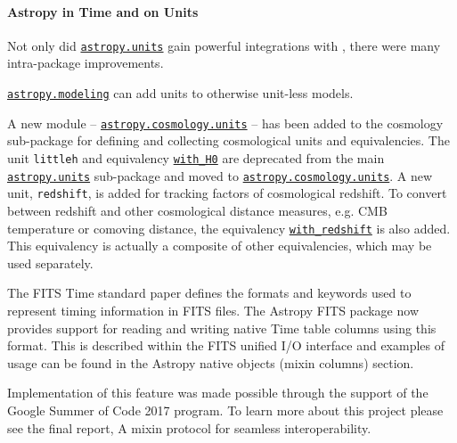 \documentclass[modern]{aastex631}
\newcommand{\astropysubpkg}[1]{\href{http://docs.astropy.org/en/stable/#1/index.html}{\texttt{astropy.#1}}\xspace}
\newcommand{\astropycosmologyunits}{\href{https://docs.astropy.org/en/stable/cosmology/units.html}{\texttt{astropy.cosmology.units}}}
\newcommand{\astropyunits}{\astropysubpkg{units}}
\newcommand{\astropymodeling}{\astropysubpkg{modeling}}
\newcommand{\astropyapi}[2]{\href{https://docs.astropy.org/en/stable/api/astropy.#1.html}{#2}}
\newcommand{\astropyapidoc}[2]{\astropyapi{#1}{\texttt{#2}\xspace}}
\begin{document}
  \paragraph{Astropy in Time and on Units}

    Not only did \astropyunits gain powerful integrations with ,
    there were many intra-package improvements.

    \astropymodeling can add units to otherwise unit-less models.

    A new module –
    \astropycosmologyunits
    – has been added to the cosmology sub-package for defining and collecting
    cosmological units and equivalencies. The unit \texttt{littleh} and
    equivalency
    \astropyapidoc{cosmology.units.with_H0}{with\_H0}
    are deprecated from the main \astropyunits sub-package and moved to
    \astropycosmologyunits. A new unit, \texttt{redshift}, is added for tracking
    factors of cosmological redshift.
    To convert between redshift and other cosmological distance
    measures, e.g. CMB temperature or comoving distance, the equivalency
    \astropyapidoc{cosmology.units.with_redshift}{with\_redshift}
    is also added. This equivalency is actually a composite of other
    equivalencies,
    which may be used separately.

    The FITS Time standard paper defines the formats and keywords used to
    represent timing information in FITS files. The Astropy FITS package now
    provides support for reading and writing native Time table columns using
    this format. This is described within the FITS unified I/O interface and
    examples of usage can be found in the Astropy native objects (mixin columns)
    section.

    Implementation of this feature was made possible through the support of the
    Google Summer of Code 2017 program. To learn more about this project please
    see the final report, A mixin protocol for seamless interoperability.
\end{document}
